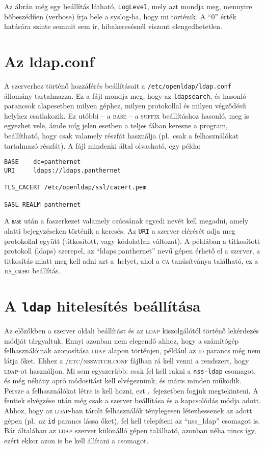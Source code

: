 Az ábrán még egy beállítás látható, \texttt{LogLevel}, mely azt mondja meg, mennyire bőbeszédűen (verbose) írja bele a
syslog-ba, hogy mi történik. A ``0'' érték hatására szinte semmit sem ír, hibakeresésnél viszont elengedhetetlen.

\section{Az ldap.conf}
A szerverhez történő hozzáférés beállításait a \texttt{/etc/openldap/ldap.conf} állomány tartalmazza.  Ez a fájl mondja
meg, hogy az \texttt{ldapsearch}, és hasonló parancsok alapesetben milyen géphez, milyen protokollal és milyen végződésű
helyhez csatlakozik. Ez utóbbi -- a \textsc{base} -- a \textsc{suffix} beállításhoz hasonló, meg is egyezhet vele, ámde
míg jelen esetben a teljes fában keresne a program, beállítható, hogy csak valamely részfát használja (pl.\ csak a
felhasználókat tartalmazó részfát). A fájl mindenki által olvasható, egy példa:

\begin{Verbatim}[frame=single,label=ldap.conf]
BASE    dc=panthernet
URI     ldaps://ldaps.panthernet

TLS_CACERT /etc/openldap/ssl/cacert.pem

SASL_REALM panthernet
\end{Verbatim}


A \texttt{\textsc{base}} után a faszerkezet valamely csúcsának egyedi nevét kell megadni, amely alatti bejegyzéseken
történik a keresés. Az \texttt{URI} a szerver elérését adja meg protokollal együtt (titkosított, vagy kódolatlan
változat). A példában a titkosított protokoll (ldaps) szerepel, az ``ldaps.panthernet'' nevű gépen érhető el a szerver,
a titkosítás miatt meg kell adni azt a~helyet, ahol a \textsc{ca} tanúsítványa található, ez a
\texttt{\textsc{tls}\_\textsc{cacert}} beállítás.


\section{A \texttt{ldap} hitelesítés beállítása}
Az előzőkben a szerver oldali beállítást és az \textsc{ldap} kiszolgálótól történő lekérdezés módját tárgyaltuk. Ennyi
azonban nem elegendő ahhoz, hogy a számítógép felhasználóinak azonosítása \textsc{ldap} alapon történjen, például az
\textsc{id} parancs még nem látja őket. Ehhez a \textsc{/etc/nsswitch.conf} fájlban rá kell venni a rendszert, hogy
\textsc{ldap}-ot használjon. Mi sem egyszerűbb: csak fel kell rakni a \texttt{nss-ldap} csomagot, és még néhány apró
módosítást kell elvégeznünk, és máris minden működik. Persze a felhasználókat létre is kell hozni, ezt
.\ fejezetben fogjuk megtekinteni. 
A fentiek elvégzése után még csak a szerver beállítása és a kapcsolódás módja adott. Ahhoz, hogy az \textsc{ldap}-ban
tárolt felhasználók ténylegesen létezhessenek az adott gépen (pl.\ az \texttt{id} parancs lássa őket), fel kell
telepíteni az ``nss\_ldap'' csomagot is. Bár általában az \textsc{ldap} szerver különálló gépen található, azonban néha
nincs így, ezért ekkor  azon is be kell állítani a csomagot.

